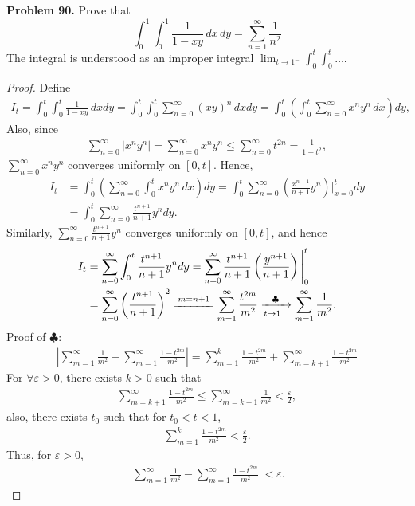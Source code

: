 \documentclass[11pt]{article}
\theoremstyle{definition}
\theoremstyle{definition}
\begin{document}
\noindent
{\bf Problem 90.}
Prove that
$$
\int_0^1\int_0^1 \frac{1}{1-xy}\, dx\, dy =\sum_{n=1}^\infty \frac{1}{n^2}
$$
The integral is understood as an improper integral
$\displaystyle\lim_{t\to 1^-} \int_0^t\int_0^t\ldots$.
\begin{proof}
Define
\begin{align*}
    I_t = \int^t_0 \int^t_0 \frac{1}{1 - xy}\, dx dy = \int^t_0 \int^t_0 \sum^\infty_{n=0} (xy)^n \, dx dy = \int^t_0 \left(\int^t_0 \sum^\infty_{n=0} x^n y^n \, dx \right)dy,
\end{align*}
Also, since
\begin{align*}
    \sum^\infty_{n=0} \left|x^n y^n \right| = \sum^\infty_{n=0} x^n y^n \leq \sum^\infty_{n=0} t^{2n} = \frac{1}{1 - t^2},
\end{align*}
$\sum^\infty_{n=0} x^n y^n$ converges uniformly on $[0,t]$. Hence, 
\begin{align*}
    I_t & = \int^t_0 \left(\sum^\infty_{n=0} \int^t_0 x^ny^n \, dx \right)dy = \int^t_0 \sum^\infty_{n=0} \left(\frac{x^{n+1}}{n+1}y^n \right)\Bigg|^t_{x=0} dy \\
    & = \int^t_0 \sum^\infty_{n=0} \frac{t^{n+1}}{n+1}y^n dy.
\end{align*}
Similarly, $\sum^\infty_{n=0} \frac{t^{n+1}}{n+1}y^n$ converges uniformly on $[0,t]$, and hence
\begin{align*}
    I_t & = \sum^\infty_{n=0} \int^t_0 \frac{t^{n+1}}{n+1}y^n dy = \sum^\infty_{n=0} \frac{t^{n+1}}{n+1} \left(\frac{y^{n+1}}{n+1}\right)\Bigg|^t_0 \\
    & = \sum^\infty_{n=0} \left(\frac{t^{n+1}}{n+1}\right)^2 \xlongequal{m=n+1} \sum^\infty_{m=1}\frac{t^{2m}}{m^2} \xrightarrow[t\to 1^-]{\clubsuit} \sum^\infty_{m=1} \frac{1}{m^2}.
\end{align*}
Proof of $\clubsuit$:
\begin{align*}
    \left| \sum^\infty_{m=1} \frac{1}{m^2} - \sum^\infty_{m=1} \frac{1-t^{2m}}{m^2} \right| = \sum^k_{m=1} \frac{1 - t^{2m}}{m^2} + \sum^\infty_{m=k+1} \frac{1 - t^{2m}}{m^2}
\end{align*}
For $\forall \varepsilon > 0$, there exists $k > 0$ such that \begin{align*}
    \sum^\infty_{m=k+1} \frac{1 - t^{2m}}{m^2} \leq \sum^\infty_{m=k+1} \frac{1}{m^2} < \frac{\varepsilon}{2},
\end{align*}
also, there exists $t_0$ such that for $t_0 < t < 1$, 
\begin{align*}
    \sum^k_{m=1} \frac{1 - t^{2m}}{m^2} < \frac{\varepsilon}{2}.
\end{align*}
Thus, for $\varepsilon > 0$, 
\begin{align*}
    \left| \sum^\infty_{m=1} \frac{1}{m^2} - \sum^\infty_{m=1} \frac{1-t^{2m}}{m^2} \right| < \varepsilon.
\end{align*}
\end{proof}
\end{document}
